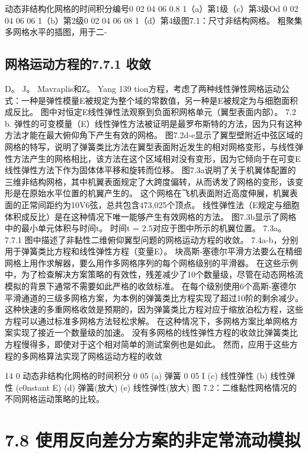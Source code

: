 \documentclass[UTF8,11pt,a4paper,openany,fontset=fandol]{ctexbook}
\begin{document}
动态非结构化网格的时间积分编号0 02 04 06 0.8 1（a）第1级（c）第3级Od 0 02 04 06 06 1（b）第2级0 02 04 06 08 1（d）第4级图7.1：尺寸非结构网格。 粗聚集多网格水平的插图，用于二-

\subsection{网格运动方程的7.7.1 收敛}
D。 J。 Mavraplis和Z。 Yang 139 tion方程，考虑了两种线性弹性网格运动公式：一种是弹性模量E被规定为整个域的常数值，另一种是E被规定为与细胞面积成反比。 图中对恒定E线性弹性法观察到负面积网格单元（翼型表面内部）。 7.2 b. 弹性的可变模量（E）线性弹性方法被证明是最罗布斯特的方法，因为只有这种方法才能在最大俯仰角下产生有效的网格。 图7.2d-e显示了翼型壁附近中弦区域的网格的特写，说明了弹簧类比方法在翼型表面附近发生的相对网格变形，与线性弹性方法产生的网格相比，该方法在这个区域相对没有变形，因为它倾向于在可变E线性弹性方法下作为固体体平移和旋转而位移。 图7.3a说明了关于机翼体配置的三维非结构网格，其中机翼表面规定了大跨度偏转，从而诱发了网格的变形，该变形是在原始水平位置的机翼产生的。 这个网格在飞机表面附近高度伸展，机翼表面的正常间距约为10V6弦，总共包含473,025个顶点。 线性弹性法（E规定与细胞体积成反比）是在这种情况下唯一能够产生有效网格的方法。 图7.3b显示了网格中的最小单元体积与时间t。 时间t = 2.5对应于图中所示的机翼位置。 7.3a。 7.7.1 图中描述了非黏性二维俯仰翼型问题的网格运动方程的收敛。 7.4a-b，分别用于弹簧类比方程和线性弹性方程（变量E）。 块高斯-塞德尔平滑方法要么在精细网格上用作求解器，要么用作多网格序列的每个网格级别的平滑器。 在这些示例中，为了检查解决方案策略的有效性，残差减少了10个数量级，尽管在动态网格流模拟的背景下通常不需要如此严格的收敛标准。 在每个级别使用6个高斯-塞德尔平滑通道的三级多网格方案，为本例的弹簧类比方程实现了超过10阶的剩余减少。 这种快速的多重网格收敛是预期的，因为弹簧类比方程对应于缩放泊松方程，这些方程可以通过标准多网格方法轻松求解。 在这种情况下，多网格方案比单网格方案实现了接近一个数量级的加速。 没有多网格的线性弹性方程的收敛比弹簧类比方程慢得多，即使对于这个相对简单的测试案例也是如此。 然而，应用于这些方程的多网格算法实现了网格运动方程的收敛

14 0 动态非结构化网格的时间积分 0 05 (a) 弹簧 0 05 I (c) 线性弹性 (b) 线性弹性 (c0nstant E) (d) 弹簧(放大) (e) 线性弹性(放大) 图 7.2：二维黏性网格情况的不同网格运动策略的比较。

\section{7.8 使用反向差分方案的非定常流动模拟}
\end{document}
